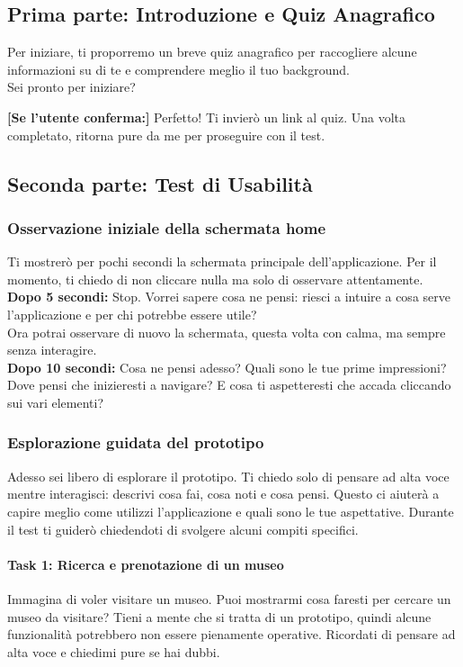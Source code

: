 \documentclass{article}
\begin{document}
\subsection{Prima parte: Introduzione e Quiz Anagrafico}
Per iniziare, ti proporremo un breve quiz anagrafico per raccogliere alcune informazioni su di te e comprendere meglio il tuo background.\\
Sei pronto per iniziare?

\textbf{[Se l'utente conferma:]} Perfetto! Ti invierò un link al quiz. Una volta completato, ritorna pure da me per proseguire con il test.

\subsection{Seconda parte: Test di Usabilità}
\subsubsection{Osservazione iniziale della schermata home}
Ti mostrerò per pochi secondi la schermata principale dell’applicazione. Per il momento, ti chiedo di non cliccare nulla ma solo di osservare attentamente.\\

\textbf{Dopo 5 secondi:} 
Stop. Vorrei sapere cosa ne pensi: riesci a intuire a cosa serve l’applicazione e per chi potrebbe essere utile?\\

Ora potrai osservare di nuovo la schermata, questa volta con calma, ma sempre senza interagire.\\

\textbf{Dopo 10 secondi:} 
Cosa ne pensi adesso? Quali sono le tue prime impressioni? Dove pensi che inizieresti a navigare? E cosa ti aspetteresti che accada cliccando sui vari elementi?

\subsubsection{Esplorazione guidata del prototipo}
Adesso sei libero di esplorare il prototipo. Ti chiedo solo di pensare ad alta voce mentre interagisci: descrivi cosa fai, cosa noti e cosa pensi. Questo ci aiuterà a capire meglio come utilizzi l’applicazione e quali sono le tue aspettative. Durante il test ti guiderò chiedendoti di svolgere alcuni compiti specifici.

\paragraph*{Task 1: Ricerca e prenotazione di un museo}
Immagina di voler visitare un museo. Puoi mostrarmi cosa faresti per cercare un museo da visitare? Tieni a mente che si tratta di un prototipo, quindi alcune funzionalità potrebbero non essere pienamente operative. Ricordati di pensare ad alta voce e chiedimi pure se hai dubbi.\\
\end{document}
